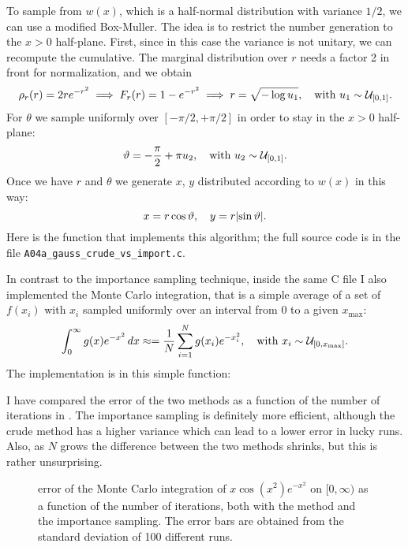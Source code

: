 To sample from $w(x)$, which is a half-normal distribution with variance $1/2$,
we can use a modified Box-Muller. The idea is to restrict the number generation
to the $x > 0$ half-plane. First, since in this case the variance is not
unitary, we can recompute the cumulative. The marginal distribution over $r$
needs a factor \num{2} in front for normalization, and we obtain
\begin{equation}
    \rho_r(r) = 2re^{-r^{2}} \implies F_r(r) = 1 - e^{-r^{2}} \implies
    r = \sqrt{-\log u_1}, \quad\text{with } u_1 \sim \mathcal{U}_{[0, 1]}.
\end{equation}
For $\theta$ we sample uniformly over $[-\pi/2, +\pi/2]$ in order to stay in the
$x > 0$ half-plane:
\begin{equation}
    \vartheta = -\frac{\pi}{2} + \pi u_2, \quad
    \text{with } u_2 \sim \mathcal{U}_{[0, 1]}.
\end{equation}
Once we have $r$ and $\theta$ we generate $x$, $y$ distributed according to
$w(x)$ in this way:
\begin{equation}
    x = r \cos\theta,\quad y = r\abs{\sin\theta}.
\end{equation}
Here is the function that implements this algorithm; the full source code is in
the file \texttt{A04a\_gauss\_crude\_vs\_import.c}.


In contrast to the importance sampling technique, inside the same C file I also
implemented the  Monte Carlo integration, that is a simple
average of a set of $f(x_i)$ with $x_i$ sampled uniformly over an interval from
$0$ to a given $x_{\mathrm{max}}$:
\begin{equation}
    \int_{0}^{\infty} g(x) e^{-x^{2}}\, dx \approx
    = \frac{1}{N} \sum_{i = 1}^{N} g(x_i) e^{-x_i^2}, \quad
    \text{with } x_i \sim \mathcal{U}_{[0, x_{\mathrm{max}}]}.
\end{equation}
The implementation is in this simple function:


I have compared the error of the two methods as a function of the number of
iterations in . The importance sampling is definitely
more efficient, although the crude method has a higher variance which can lead
to a lower error in lucky runs. Also, as $N$ grows the difference between the
two methods shrinks, but this is rather unsurprising.

\begin{figure}
    \centering
    
    \caption{error of the Monte Carlo integration of $x \cos(x^{2}) e^{-x^{2}}$
        on $[0, \infty)$ as a function of the number of iterations, both with
        the  method and the importance sampling. The error bars
        are obtained from the standard deviation of \num{100} different runs.}
    \label{fig:A04a}
\end{figure}

